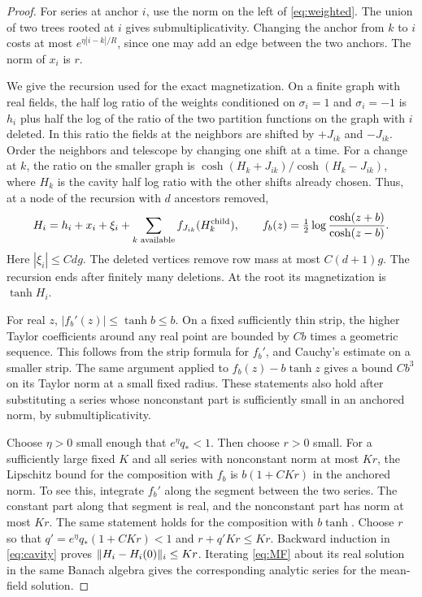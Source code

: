\documentclass[11pt]{article}
\DeclarePairedDelimiter{\norm}{\lVert}{\rVert}
\begin{document}
\begin{proof}
For series at anchor \(i\), use the norm on the left of
\eqref{eq:weighted}. The union of two trees rooted at \(i\) gives
submultiplicativity. Changing the anchor from \(k\) to \(i\) costs at
most \(e^{\eta|i-k|/R}\), since one may add an edge between the two
anchors. The norm of \(x_i\) is \(r\).

We give the recursion used for the exact magnetization. On a finite
graph with real fields, the half log ratio of the weights conditioned
on \(\sigma_i=1\) and \(\sigma_i=-1\) is \(h_i\) plus half the log of the
ratio of the two partition functions on the graph with \(i\) deleted.
In this ratio the fields at the neighbors are shifted by \(+J_{ik}\)
and \(-J_{ik}\). Order the neighbors and telescope by changing one shift
at a time. For a change at \(k\), the ratio on the smaller graph is
\(\cosh(H_k+J_{ik})/\cosh(H_k-J_{ik})\), where \(H_k\) is the cavity
half log ratio with the other shifts already chosen. Thus, at a node
of the recursion with \(d\) ancestors removed,
\begin{equation}\label{eq:cavity}
 H_i=h_i+x_i+\xi_i+
       \sum_{k\text{ available}} f_{J_{ik}}(H_k^{\rm child}),
 \qquad
 f_b(z)=\tfrac12\log\frac{\cosh(z+b)}{\cosh(z-b)}.
\end{equation}
Here \(|\xi_i|\le C dg\). The deleted vertices remove row mass at
most \(C(d+1)g\). The recursion ends after finitely many
deletions. At the root its magnetization is \(\tanh H_i\).

For real \(z\), \(|f_b'(z)|\le\tanh b\le b\). On a fixed sufficiently
thin strip, the higher Taylor coefficients around any real point
are bounded by \(C b\) times a geometric sequence. This follows from
the strip formula for \(f_b'\), and Cauchy's estimate on a smaller
strip. The same argument applied to
\(f_b(z)-b\tanh z\) gives a bound \(C b^3\) on its Taylor norm at a
small fixed radius. These statements also hold after substituting
a series whose nonconstant part is sufficiently small in an anchored
norm, by submultiplicativity.

Choose \(\eta>0\) small enough that \(e^\eta q_*<1\). Then choose
\(r>0\) small. For a sufficiently large fixed \(K\) and all series
with nonconstant norm at most \(Kr\), the Lipschitz bound for the
composition with \(f_b\) is \(b(1+CKr)\) in the anchored norm.
To see this, integrate \(f_b'\) along the segment between the two
series. The constant part along that segment is real, and the
nonconstant part has norm at most \(Kr\).
The same statement holds for the composition with \(b\tanh\).
Choose \(r\) so that \(q'=e^\eta q_*(1+CKr)<1\) and
\(r+q'Kr\le Kr\). Backward induction in \eqref{eq:cavity} proves
\(\norm{H_i-H_i(0)}_i\le Kr\). Iterating \eqref{eq:MF} about its real
solution in the same Banach algebra gives the corresponding analytic
series for the mean-field solution.


\end{proof}
\end{document}
